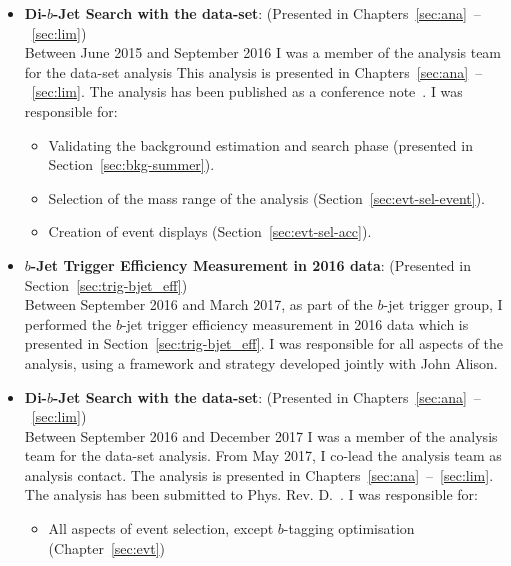\begin{itemize}[leftmargin=*]
\item\textbf{Di-$b$-Jet Search  with the \summer{} data-set}: (Presented in Chapters~\ref{sec:ana}~--~\ref{sec:lim})\\ 
  Between June 2015 and September 2016 I was a member of the analysis team for the \summer{} data-set analysis
  This analysis is presented in Chapters~\ref{sec:ana}~--~\ref{sec:lim}.
  The analysis has been published as a conference note~\cite{dibjet-ichep_conf}. 
  I was responsible for:
  \begin{itemize}
    \item Validating the background estimation and search phase (presented in Section~\ref{sec:bkg-summer}).
    \item Selection of the mass range of the analysis (Section~\ref{sec:evt-sel-event}).
    \item Creation of event displays (Section~\ref{sec:evt-sel-acc}).
  \end{itemize}
  \vspace{1em}
\item\textbf{$b$-Jet Trigger Efficiency Measurement in 2016 data}: (Presented in Section~\ref{sec:trig-bjet_eff})\\
  Between September 2016 and March 2017, as part of the $b$-jet trigger group,
  I performed the $b$-jet trigger efficiency measurement in 2016 data which is presented in Section~\ref{sec:trig-bjet_eff}.
  I was responsible for all aspects of the analysis, using a framework and strategy developed jointly with John Alison.
  \vspace{1em}
\item\textbf{Di-$b$-Jet Search with the \lm{} data-set}: (Presented in Chapters~\ref{sec:ana}~--~\ref{sec:lim})\\ 
  Between September 2016 and December 2017 I was a member of the analysis team for the \lm{} data-set analysis.
  From May 2017, I co-lead the analysis team as analysis contact.
  The analysis is presented in Chapters~\ref{sec:ana}~--~\ref{sec:lim}.
  The analysis has been submitted to Phys. Rev. D.~\cite{dibjet-full}.
  I was responsible for:
  \begin{itemize}
    \item All aspects of event selection, except $b$-tagging optimisation (Chapter~\ref{sec:evt})

\end{itemize}
\end{itemize}
